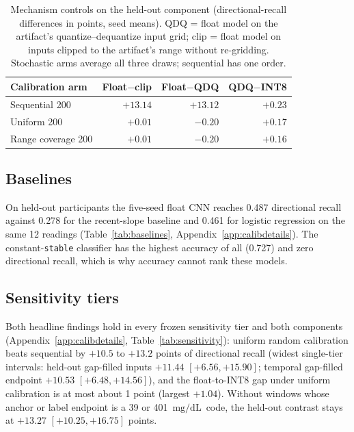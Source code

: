 \documentclass[10pt,twocolumn]{article}
\newcommand{\mgdl}{\ensuremath{\mathrm{mg/dL}}}
\begin{document}
\begin{table}[t]
\centering
\caption{Mechanism controls on the held-out component (directional-recall
differences in points, seed means). QDQ = float model on the
artifact's quantize--dequantize input grid; clip = float model on inputs
clipped to the artifact's range without re-gridding. Stochastic arms average all three draws; sequential has one order.}
\label{tab:mechanism}
\footnotesize
\begin{tabular}{@{}lrrr@{}}
\toprule
Calibration arm & Float$-$clip & Float$-$QDQ & QDQ$-$INT8 \\
\midrule
Sequential 200 & $+13.14$ & $+13.12$ & $+0.23$ \\
Uniform 200 & $+0.01$ & $-0.20$ & $+0.17$ \\
Range coverage 200 & $+0.01$ & $-0.20$ & $+0.16$ \\
\bottomrule
\end{tabular}
\end{table}

\subsection{Baselines}

On held-out participants the five-seed float CNN reaches 0.487 directional
recall against 0.278 for the recent-slope baseline and 0.461 for logistic
regression on the same 12 readings (Table~\ref{tab:baselines},
Appendix~\ref{app:calibdetails}). The constant-\texttt{stable} classifier
has the highest accuracy of all (0.727) and zero directional recall, which
is why accuracy cannot rank these models.

\subsection{Sensitivity tiers}
\label{sec:sensitivity}

Both headline findings hold in every frozen sensitivity tier and both
components (Appendix~\ref{app:calibdetails}, Table~\ref{tab:sensitivity}):
uniform random calibration beats sequential by $+10.5$ to $+13.2$ points
of directional recall (widest single-tier intervals: held-out gap-filled
inputs $+11.44$ $[+6.56, +15.90]$; temporal gap-filled endpoint $+10.53$
$[+6.48, +14.56]$), and the float-to-INT8 gap under uniform calibration
is at most about 1 point (largest $+1.04$). Without windows whose anchor or label endpoint
is a 39 or 401~\mgdl\ code, the held-out contrast stays at $+13.27$
$[+10.25, +16.75]$ points.
\end{document}
